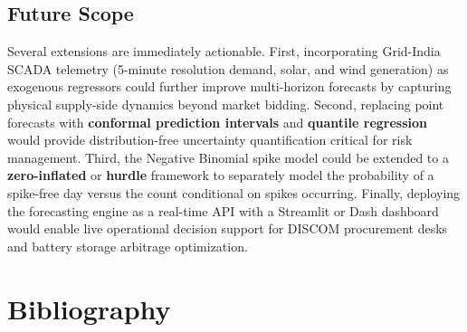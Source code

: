 \documentclass[12pt, a4paper]{article}
\theoremstyle{definition}
\begin{document}
\subsection{Future Scope}

Several extensions are immediately actionable. First, incorporating Grid-India SCADA telemetry (5-minute resolution demand, solar, and wind generation) as exogenous regressors could further improve multi-horizon forecasts by capturing physical supply-side dynamics beyond market bidding. Second, replacing point forecasts with \textbf{conformal prediction intervals} and \textbf{quantile regression} would provide distribution-free uncertainty quantification critical for risk management. Third, the Negative Binomial spike model could be extended to a \textbf{zero-inflated} or \textbf{hurdle} framework to separately model the probability of a spike-free day versus the count conditional on spikes occurring. Finally, deploying the forecasting engine as a real-time API with a Streamlit or Dash dashboard would enable live operational decision support for DISCOM procurement desks and battery storage arbitrage optimization.

\section*{Bibliography}
\end{document}
